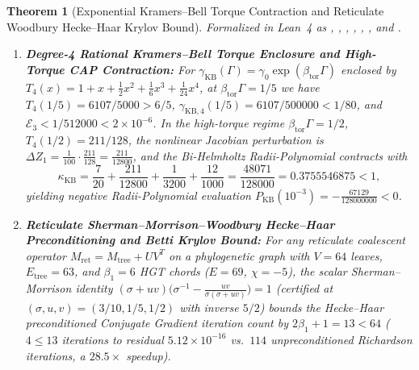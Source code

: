 \documentclass[11pt,a4paper]{article}
\newtheorem{theorem}{Theorem}[section]
\theoremstyle{definition}
\begin{document}
\begin{theorem}[Exponential Kramers--Bell Torque Contraction and Reticulate Woodbury Hecke--Haar Krylov Bound]
\label{thm:kramers_bell_woodbury}
Formalized in Lean~4 as , , , , , , and .
\begin{enumerate}
  \item \textbf{Degree-4 Rational Kramers--Bell Torque Enclosure and High-Torque CAP Contraction:} For $\gamma_{\mathrm{KB}}(\Gamma) = \gamma_0\exp(\beta_{\mathrm{tor}}\Gamma)$ enclosed by $T_4(x) = 1 + x + \frac{1}{2}x^2 + \frac{1}{6}x^3 + \frac{1}{24}x^4$, at $\beta_{\mathrm{tor}}\Gamma = 1/5$ we have $T_4(1/5) = 6107/5000 > 6/5$, $\gamma_{\mathrm{KB},4}(1/5) = 6107/500000 < 1/80$, and $\mathcal{E}_3 < 1/512000 < 2\times 10^{-6}$. In the high-torque regime $\beta_{\mathrm{tor}}\Gamma = 1/2$, $T_4(1/2) = 211/128$, the nonlinear Jacobian perturbation is $\Delta Z_1 = \frac{1}{100}\cdot\frac{211}{128} = \frac{211}{12800}$, and the Bi-Helmholtz Radii-Polynomial contracts with
  \begin{equation}
    \kappa_{\mathrm{KB}} = \frac{7}{20} + \frac{211}{12800} + \frac{1}{3200} + \frac{12}{1000} = \frac{48071}{128000} = 0.3755546875 < 1,
  \end{equation}
  yielding negative Radii-Polynomial evaluation $P_{\mathrm{KB}}(10^{-3}) = -\frac{67129}{128000000} < 0$.
  \item \textbf{Reticulate Sherman--Morrison--Woodbury Hecke--Haar Preconditioning and Betti Krylov Bound:} For any reticulate coalescent operator $M_{\mathrm{ret}} = M_{\mathrm{tree}} + U V^T$ on a phylogenetic graph with $V = 64$ leaves, $E_{\mathrm{tree}} = 63$, and $\beta_1 = 6$ HGT chords ($E = 69$, $\chi = -5$), the scalar Sherman--Morrison identity $(\sigma + uv)\bigl(\sigma^{-1} - \frac{uv}{\sigma(\sigma+uv)}\bigr) = 1$ (certified at $(\sigma,u,v) = (3/10, 1/5, 1/2)$ with inverse $5/2$) bounds the Hecke--Haar preconditioned Conjugate Gradient iteration count by $2\beta_1 + 1 = 13 < 64$ ($4 \le 13$ iterations to residual $5.12\times 10^{-16}$ vs.\ $114$ unpreconditioned Richardson iterations, a $28.5\times$ speedup).
\end{enumerate}
\end{theorem}
\end{document}
